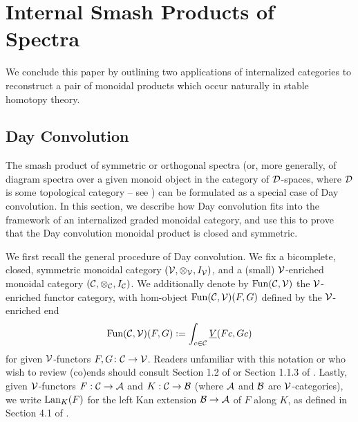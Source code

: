 \documentclass[openany, amssymb, psamsfonts]{amsart}
\theoremstyle{definition}
\numberwithin{equation}{section}
\begin{document}
\section{Internal Smash Products of Spectra}
\label{section:spectra}

We conclude this paper by outlining two applications of internalized categories to reconstruct a pair of monoidal products which occur naturally in stable homotopy theory. 

\subsection{Day Convolution}
\label{subsection:day_convolution}

The smash product of symmetric or orthogonal spectra (or, more generally, of diagram spectra over a given monoid object in the category of $\mathcal{D}$-spaces, where $\mathcal{D}$ is some topological category -- see \cite{MMSS}) can be formulated as a special case of Day convolution. In this section, we describe how Day convolution fits into the framework of an internalized graded monoidal category, and use this to prove that the Day convolution monoidal product is closed and symmetric.

We first recall the general procedure of Day convolution. We fix a bicomplete, closed, symmetric monoidal category $(\mathcal{V}, \otimes_{\mathcal{V}}, I_{\mathcal{V}})$, and a (small) $\mathcal{V}$-enriched monoidal category $(\mathcal{C}, \otimes_{\mathcal{C}}, I_{\mathcal{C}})$. We additionally denote by $\operatorname{Fun}(\mathcal{C}, \mathcal{V})$ the $\mathcal{V}$-enriched functor category, with hom-object $\operatorname{Fun}(\mathcal{C}, \mathcal{V})(F, G)$ defined by the $\mathcal{V}$-enriched end
\begin{equation*}
    \operatorname{Fun}(\mathcal{C}, \mathcal{V})(F, G) := \int_{c \in \mathcal{C}} \underline{V}(Fc, Gc)
\end{equation*} for given $\mathcal{V}$-functors $F, G \colon \mathcal{C} \to \mathcal{V}$. Readers unfamiliar with this notation or who wish to review (co)ends should consult Section 1.2 of \cite{riehl} or Section 1.1.3 of \cite{coend}. Lastly, given $\mathcal{V}$-functors $F: \mathcal{C} \to \mathcal{A}$ and $K: \mathcal{C} \to \mathcal{B}$ (where $\mathcal{A}$ and $\mathcal{B}$ are $\mathcal{V}$-categories), we write $\operatorname{Lan}_K(F)$ for the left Kan extension $\mathcal{B} \to \mathcal{A}$ of $F$ along $K$, as defined in Section 4.1 of \cite{kelly}.
\end{document}
